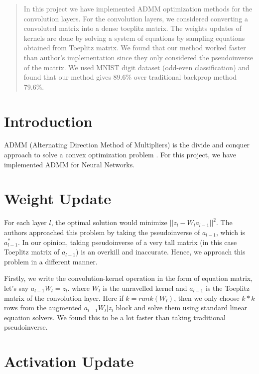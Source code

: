 \documentclass[12pt]{article}
\begin{document}
\maketitle

\begin{abstract}
In this project we have implemented ADMM optimization methods for the convolution layers.
For the convolution layers, we considered converting a convoluted matrix into a dense toeplitz matrix.
The weights updates of kernels are done by solving a system of equations by sampling equations obtained from Toeplitz matrix.
We found that our method worked faster than author's implementation since they only considered the pseudoinverse of the matrix.
We used MNIST digit dataset (odd-even classification) and found that our method gives 89.6\% over traditional backprop method 79.6\%.
\end{abstract}

\section{Introduction}
ADMM (Alternating Direction Method of Multipliers) is the divide and conquer approach to solve a convex optimization problem \cite{taylor2016training}.
For this project, we have implemented ADMM for Neural Networks.

\section{Weight Update}

For each layer $l$, the optimal solution would minimize $||z_l - W_l a_{l-1} ||^2$.
The authors approached this problem by taking the pseudoinverse of $a_{l-1}$, which is $a_{l-1}^*$.
In our opinion, taking pseudoinverse of a very tall matrix (in this case Toeplitz matrix \cite{gray2006toeplitz} of $a_{l-1}$) is an overkill and inaccurate.
Hence, we approach this problem in a different manner.

Firstly, we write the convolution-kernel operation in the form of equation matrix, let's say $a_{l-1}W_l  = z_l$.
where $W_l$ is the unravelled kernel and $a_{l-1}$ is the Toeplitz matrix of the convolution layer.
Here if $k = rank(W_l)$, then we only choose $k*k$ rows from the augmented $a_{l-1}W_l | z_l$ block and solve them using standard linear equation solvers.
We found this to be a lot faster than taking traditional pseudoinverse.

\section{Activation Update}
\end{document}
